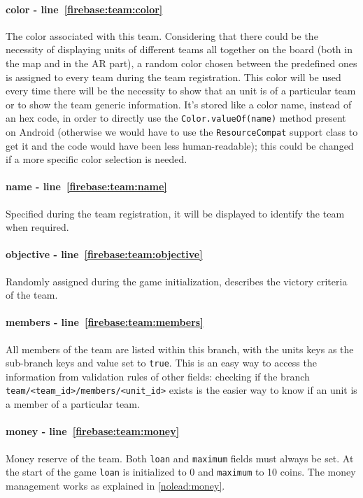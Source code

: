 				\paragraph{color - line~\ref{firebase:team:color}}
				The color associated with this team. Considering that there could be the necessity of displaying units of different teams all together on the board (both in the map and in the AR part), a random color chosen between the predefined ones is assigned to every team during the team registration. This color will be used every time there will be the necessity to show that an unit is of a particular team or to show the team generic information.
				It's stored like a color name, instead of an hex code, in order to directly use the \lstinline|Color.valueOf(name)| method present on Android (otherwise we would have to use the \lstinline|ResourceCompat| support class to get it and the code would have been less human-readable); this could be changed if a more specific color selection is needed.
			
				\paragraph{name - line~\ref{firebase:team:name}}
				Specified during the team registration, it will be displayed to identify the team when required.
				
				\paragraph{objective - line~\ref{firebase:team:objective}}
				Randomly assigned during the game initialization, describes the victory criteria of the team.
			
				\paragraph{members - line~\ref{firebase:team:members}}
				All members of the team are listed within this branch, with the units keys as the sub-branch keys and value set to \lstinline|true|. This is an easy way to access the information from validation rules of other fields: checking if the branch \lstinline|team/<team_id>/members/<unit_id>| exists is the easier way to know if an unit is a member of a particular team.
			
				\paragraph{money - line~\ref{firebase:team:money}}
				Money reserve of the team. Both \lstinline|loan| and \lstinline|maximum| fields must always be set. At the start of the game \lstinline|loan| is initialized to 0 and \lstinline|maximum| to 10 coins.
				The money management works as explained in \autoref{nolead:money}.
				
